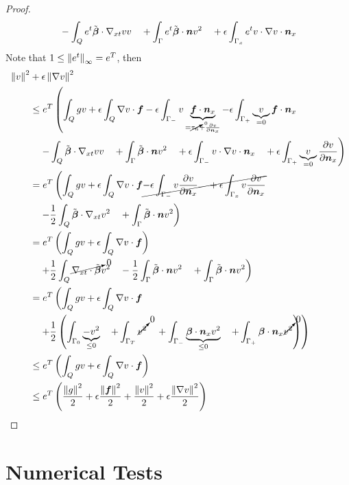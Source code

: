 \documentclass{article}
\begin{document}
\begin{proof}
\begin{align*}
&\quad-\int_Qe^{t}\tilde{\boldsymbol\beta}\cdot\nabla_{xt} vv
\quad+\int_\Gamma e^{t}\tilde{\boldsymbol\beta}\cdot\boldsymbol n v^2
\quad+\epsilon\int_{\Gamma_x}e^{t}v\cdot\nabla v\cdot\boldsymbol n_x
\end{align*}
Note that $1\leq\left\| e^t \right\|_\infty=e^T$, 
then
\begin{align*}
\left\| v \right\|^2
&+\epsilon\left\| \nabla v \right\|^2
\\
&\leq
e^T\left(
\int_Qgv
+\epsilon\int_Q\nabla v\cdot\boldsymbol f
-\epsilon\int_{\Gamma_-}v\underbrace{\boldsymbol f\cdot\boldsymbol n_x}_{=\cancelto{0}{\tau_n}+\frac{\partial v}{\partial\boldsymbol n_x}}
-\epsilon\int_{\Gamma_+}\underbrace{v}_{=0}\boldsymbol f\cdot\boldsymbol n_x
\right.\\
&\left.
\quad-\int_Q\tilde{\boldsymbol\beta}\cdot\nabla_{xt} vv
\quad+\int_\Gamma \tilde{\boldsymbol\beta}\cdot\boldsymbol n v^2
\quad+\epsilon\int_{\Gamma_-}v\cdot\nabla v\cdot\boldsymbol n_x
\quad+\epsilon\int_{\Gamma_+}\underbrace{v}_{=0}\frac{\partial v}{\partial\boldsymbol n_x}
\right)
\\
&=
e^T\left(
\int_Qgv
+\epsilon\int_Q\nabla v\cdot\boldsymbol f
\cancel{
-\epsilon\int_{\Gamma_-}v\frac{\partial v}{\partial\boldsymbol n_x}
\quad+\epsilon\int_{\Gamma_x}v\frac{\partial v}{\partial\boldsymbol n_x}
}
\right.\\
&\left.
\quad-\frac{1}{2}\int_Q\tilde{\boldsymbol\beta}\cdot\nabla_{xt} v^2
\quad+\int_\Gamma \tilde{\boldsymbol\beta}\cdot\boldsymbol n v^2
\right)
\\
&=
e^T\left(
\int_Qgv
+\epsilon\int_Q\nabla v\cdot\boldsymbol f
\right)\\
&\left.
\quad+\frac{1}{2}\int_Q\cancelto{0}{\nabla_{xt}\cdot\tilde{\boldsymbol\beta}} v^2
\quad-\frac{1}{2}\int_\Gamma\tilde{\boldsymbol\beta}\cdot\boldsymbol n v^2
\quad+\int_\Gamma \tilde{\boldsymbol\beta}\cdot\boldsymbol n v^2
\right)
\\
&=
e^T\left(
\int_Qgv
+\epsilon\int_Q\nabla v\cdot\boldsymbol f
\right.\\
&\left.
\quad+\frac{1}{2}\left( \int_{\Gamma_0} \underbrace{-v^2}_{\leq 0}
\quad+\int_{\Gamma_T} \cancelto{0}{v^2}
\quad+\int_{\Gamma_-} \underbrace{\boldsymbol\beta\cdot\boldsymbol n_x v^2}_{\leq 0}
\quad+\int_{\Gamma_+} \boldsymbol\beta\cdot\boldsymbol n_x \cancelto{0}{v^2}
 \right)
\right)
\\
&\leq
e^T\left(
\int_Qgv
+\epsilon\int_Q\nabla v\cdot\boldsymbol f
\right)
\\
&\leq
e^T\left(
\frac{\left\| g \right\|^2}{2}
+\epsilon\frac{\left\| \boldsymbol f \right\|^2}{2}
+\frac{\left\| v \right\|^2}{2}
+\epsilon\frac{\left\| \nabla v \right\|^2}{2}
\right)
\end{align*}
\end{proof}

\section{Numerical Tests}
\end{document}
